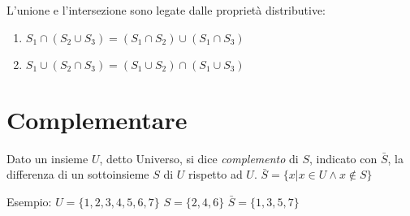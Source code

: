 L'unione e l'intersezione sono legate dalle proprietà distributive:

\begin{enumerate}
  \item $S_1 \cap (S_2 \cup S_3) = (S_1 \cap S_2) \cup (S_1 \cap S_3)$
  \item $S_1 \cup (S_2 \cap S_3) = (S_1 \cup S_2) \cap (S_1 \cup S_3)$
\end{enumerate}

\section{Complementare}
Dato un insieme $U$, detto Universo, si dice \textit{complemento} di $S$, indicato con $\bar{S}$,
la differenza di un sottoinsieme $S$ di $U$ rispetto ad $U$.\newline
$\bar{S} = \{x | x \in U \land x \not \in S \} $

Esempio: \newline
$U = \{1,2,3,4,5,6,7\} $\newline
$S = \{2,4,6\} $ \newline
$\bar{S} = \{1,3,5,7\} $


